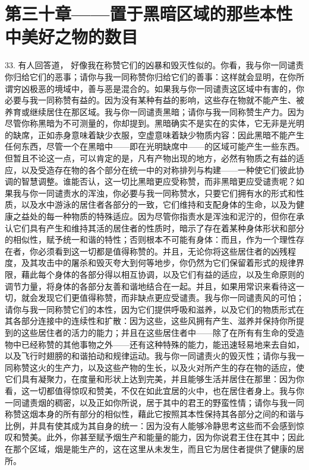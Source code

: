 
\section{第三十章——置于黑暗区域的那些本性中美好之物的数目}

33. 有人回答道， 好像我在称赞它们的凶暴和毁灭性似的。你看，我与你一同谴责你归给它们的恶事；请你与我一同称赞你归给它们的善事：这样就会显明，在你所谓穷凶极恶的境域中，善与恶是混合的。如果我与你一同谴责这区域中有害的，你必要与我一同称赞有益的。因为没有某种有益的影响，这些存在物就不能产生、被养育或继续居住在那区域。我与你一同谴责黑暗；请你与我一同称赞生产力。因为尽管你称黑暗为不可测量的，你却提到。黑暗确实不是实在的实体，它无非是光明的缺席，正如赤身意味着缺少衣服，空虚意味着缺少物质内容：因此黑暗不能产生任何东西，尽管一个在黑暗中——即在光明缺席中——的区域可能产生一些东西。但暂且不论这一点，可以肯定的是，凡有产物出现的地方，必然有物质之有益的适应，以及受造存在物的各个部分在统一中的对称排列与构建——一种使它们彼此协调的智慧调整。谁能否认，这一切比黑暗更应受称赞，而非黑暗更应受谴责呢？如果我与你一同谴责水的浑浊，你必要与我一同称赞水，只要它们拥有水的形式和性质，以及水中游泳的居住者各部分的一致，它们维持和支配身体的生命，以及为健康之益处的每一种物质的特殊适应。因为尽管你指责水是浑浊和泥泞的，但你在承认它们具有产生和维持其活的居住者的性质时，暗示了存在着某种身体形状和部分的相似性，赋予统一和谐的特性；否则根本不可能有身体：而且，作为一个理性存在者，你必须看到这一切都是值得称赞的。并且，无论你将这些居住者的凶残程度，及其攻击中的屠杀和毁灭夸大到何等地步，你仍然为它们保留着形式的规律界限，藉此每个身体的各部分得以相互协调，以及它们有益的适应，以及生命原则的调节力量，将身体的各部分友善和谐地结合在一起。并且，如果用常识来看待这一切，就会发现它们更值得称赞，而非缺点更应受谴责。我与你一同谴责风的可怕；请你与我一同称赞它们的本性，因为它们提供呼吸和滋养，以及它们的物质形式在其各部分连接中的连续性和扩散：因为这些，这些风拥有产生、滋养并保持你所提到的这些居住者的活力的能力；并且在这些居住者中——除了在所有有生命的受造物中已经称赞的其他事物之外——还有这种特殊的能力，能迅速轻易地来去自如，以及飞行时翅膀的和谐拍动和规律运动。我与你一同谴责火的毁灭性；请你与我一同称赞这火的生产力，以及这些产物的生长，以及火对所产生的存在物的适应，使它们具有凝聚力，在度量和形状上达到完美，并且能够生活并居住在那里：因为你看，这一切都值得惊叹和赞美，不仅在如此宜居的火中，也在居住者身上。我与你一同谴责烟的稠密，以及正如你所说，居于其中的君王的野蛮性情；请你与我一同称赞这烟本身的所有部分的相似性，藉此它按照其本性保持其各部分之间的和谐与比例，并具有使其成为其自身的统一：因为没有人能够冷静思考这些而不会感到惊叹和赞美。此外，你甚至赋予烟生产和能量的能力，因为你说君王住在其中；因此在那个区域，烟是能生产的，这在这里从未发生，而且它为居住者提供了健康的居所。\par

